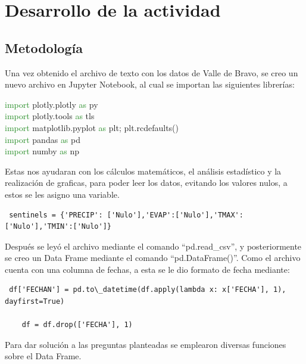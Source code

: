 \documentclass[12pt]{article}
\begin{document}
\section{Desarrollo de la actividad}
\subsection{Metodología}
Una vez obtenido el archivo de texto con los datos de Valle de Bravo, se creo un nuevo archivo en Jupyter Notebook, al cual se importan las siguientes librerías:

\begin{center}
\textcolor{ForestGreen} {import} plotly.plotly \textcolor{ForestGreen}{as} py\\
\textcolor{ForestGreen} {import} plotly.tools \textcolor{ForestGreen} {as} tls\\
\textcolor{ForestGreen} {import} matplotlib.pyplot \textcolor{ForestGreen} {as} plt; plt.rcdefaults()\\
\textcolor{ForestGreen} {import} pandas \textcolor{ForestGreen} {as} pd\\
\textcolor{ForestGreen} {import} numby \textcolor{ForestGreen} {as} np\\


\end{center}Estas nos ayudaran con los cálculos matemáticos, el análisis estadístico y la realización de graficas, para poder leer los datos, evitando los valores nulos, a estos se les asigno una variable.

\begin{center}
\begin{verbatim} sentinels = {'PRECIP': ['Nulo'],'EVAP':['Nulo'],'TMAX':['Nulo'],'TMIN':['Nulo']} \end{verbatim}
\end{center}
Después se leyó el archivo mediante el comando “pd.read\_csv”, y posteriormente se creo un Data Frame mediante el comando “pd.DataFrame()”.
Como el archivo cuenta con una columna de fechas, a esta se le dio formato de fecha mediante:

\begin{center}
\begin{verbatim} df['FECHAN'] = pd.to\_datetime(df.apply(lambda x: x['FECHA'], 1), dayfirst=True)
    
    df = df.drop(['FECHA'], 1)
    \end{verbatim}
\end{center}
Para dar solución a las preguntas planteadas se emplearon diversas funciones sobre el Data Frame.
\end{document}
